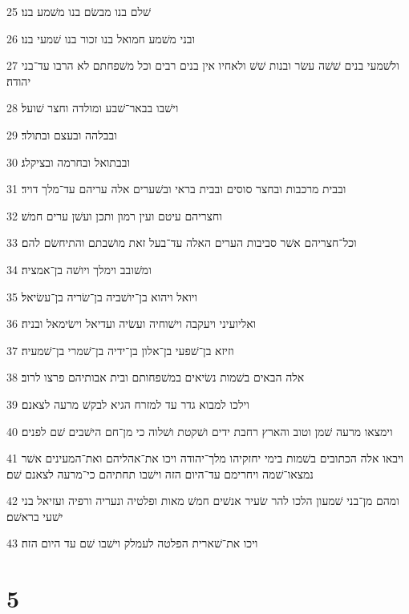\par 25 שׁלם בנו מבשׂם בנו משׁמע בנו׃
\par 26 ובני משׁמע חמואל בנו זכור בנו שׁמעי בנו׃
\par 27 ולשׁמעי בנים שׁשׁה עשׂר ובנות שׁשׁ ולאחיו אין בנים רבים וכל משׁפחתם לא הרבו עד־בני יהודה׃
\par 28 וישׁבו בבאר־שׁבע ומולדה וחצר שׁועל׃
\par 29 ובבלהה ובעצם ובתולד׃
\par 30 ובבתואל ובחרמה ובציקלג׃
\par 31 ובבית מרכבות ובחצר סוסים ובבית בראי ובשׁערים אלה עריהם עד־מלך דויד׃
\par 32 וחצריהם עיטם ועין רמון ותכן ועשׁן ערים חמשׁ׃
\par 33 וכל־חצריהם אשׁר סביבות הערים האלה עד־בעל זאת מושׁבתם והתיחשׂם להם׃
\par 34 ומשׁובב וימלך ויושׁה בן־אמציה׃
\par 35 ויואל ויהוא בן־יושׁביה בן־שׂריה בן־עשׂיאל׃
\par 36 ואליועיני ויעקבה וישׁוחיה ועשׂיה ועדיאל וישׂימאל ובניה׃
\par 37 וזיזא בן־שׁפעי בן־אלון בן־ידיה בן־שׁמרי בן־שׁמעיה׃
\par 38 אלה הבאים בשׁמות נשׂיאים במשׁפחותם ובית אבותיהם פרצו לרוב׃
\par 39 וילכו למבוא גדר עד למזרח הגיא לבקשׁ מרעה לצאנם׃
\par 40 וימצאו מרעה שׁמן וטוב והארץ רחבת ידים ושׁקטת ושׁלוה כי מן־חם הישׁבים שׁם לפנים׃
\par 41 ויבאו אלה הכתובים בשׁמות בימי יחזקיהו מלך־יהודה ויכו את־אהליהם ואת־המעינים אשׁר נמצאו־שׁמה ויחרימם עד־היום הזה וישׁבו תחתיהם כי־מרעה לצאנם שׁם׃
\par 42 ומהם מן־בני שׁמעון הלכו להר שׂעיר אנשׁים חמשׁ מאות ופלטיה ונעריה ורפיה ועזיאל בני ישׁעי בראשׁם׃
\par 43 ויכו את־שׁארית הפלטה לעמלק וישׁבו שׁם עד היום הזה׃

\chapter{5}

